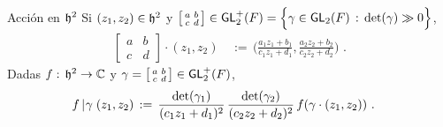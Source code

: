 \begin{frame}{Acci\'{o}n en $\hP^{2}$}
	Si $(z_1,z_2)\in\hP^2$ y
	\begin{math}
		\left[\begin{smallmatrix}
			a & b \\ c & d
		\end{smallmatrix}\right]\in\GLtp[2](F)=
			\Big\{\gamma\in\GL[2](F)\,:\,\det(\gamma)\gg 0\Big\}
	\end{math},
	\begin{align*}
		\begin{bmatrix} a & b \\ c & d \end{bmatrix}\cdot (z_1,z_2)
			& \,:=\,\bigg(
			\frac{a_{1}z_{1}+b_{1}}{c_{1}z_{1}+d_{1}},
			\frac{a_{2}z_{2}+b_{2}}{c_{2}z_{2}+d_{2}}\bigg)
		\text{ .}
	\end{align*}
	Dadas $f:\,\hP^2\rightarrow\bb{C}$ y
	\begin{math}
		\gamma= \left[\begin{smallmatrix}
			a & b \\ c & d
			\end{smallmatrix}\right]\in\GLtp[2](F)
	\end{math},
	\begin{align*}
		f\operadormatrices{\null}{\gamma}(z_1,z_2) & \,:=\,
			\frac{\det(\gamma_1)}{(c_1z_1+d_1)^{2}}\,
			\frac{\det(\gamma_2)}{(c_2z_2+d_2)^{2}}\,
			f(\gamma\cdot (z_1,z_2))
		\text{ .}
	\end{align*}

\end{frame}

